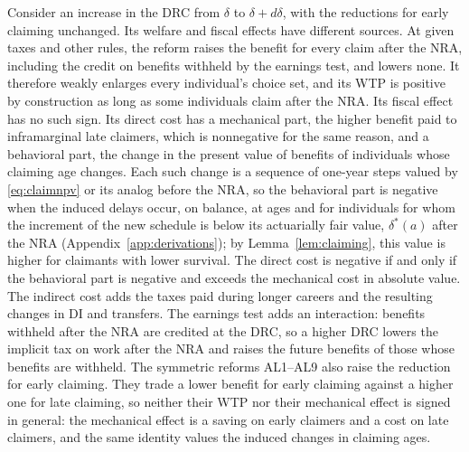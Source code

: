 Consider an increase in the DRC from $\delta$ to $\delta+d\delta$, with the reductions for early claiming unchanged. Its welfare and fiscal effects have different sources. At given taxes and other rules, the reform raises the benefit for every claim after the NRA, including the credit on benefits withheld by the earnings test, and lowers none. It therefore weakly enlarges every individual's choice set, and its WTP is positive by construction as long as some individuals claim after the NRA. Its fiscal effect has no such sign. Its direct cost has a mechanical part, the higher benefit paid to inframarginal late claimers, which is nonnegative for the same reason, and a behavioral part, the change in the present value of benefits of individuals whose claiming age changes. Each such change is a sequence of one-year steps valued by \eqref{eq:claimnpv} or its analog before the NRA, so the behavioral part is negative when the induced delays occur, on balance, at ages and for individuals for whom the increment of the new schedule is below its actuarially fair value, $\delta^{*}(a)$ after the NRA (Appendix~\ref{app:derivations}); by Lemma~\ref{lem:claiming}, this value is higher for claimants with lower survival. The direct cost is negative if and only if the behavioral part is negative and exceeds the mechanical cost in absolute value. The indirect cost adds the taxes paid during longer careers and the resulting changes in DI and transfers. The earnings test adds an interaction: benefits withheld after the NRA are credited at the DRC, so a higher DRC lowers the implicit tax on work after the NRA and raises the future benefits of those whose benefits are withheld. The symmetric reforms AL1--AL9 also raise the reduction for early claiming. They trade a lower benefit for early claiming against a higher one for late claiming, so neither their WTP nor their mechanical effect is signed in general: the mechanical effect is a saving on early claimers and a cost on late claimers, and the same identity values the induced changes in claiming ages.

